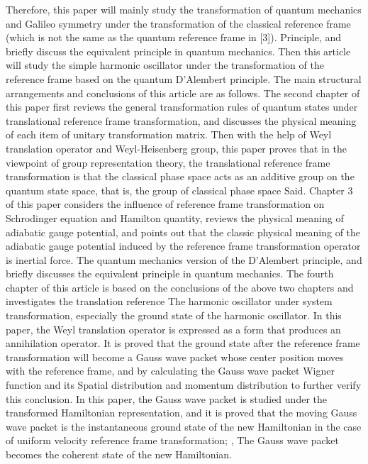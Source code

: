 \documentclass{article}
\begin{document}
        Therefore, this paper will mainly study the transformation of quantum mechanics and Galileo symmetry under the transformation of the classical reference frame (which is not the same as the quantum reference frame in [3]). Principle, and briefly discuss the equivalent principle in quantum mechanics. Then this article will study the simple harmonic oscillator under the transformation of the reference frame based on the quantum D'Alembert principle.
        The main structural arrangements and conclusions of this article are as follows. The second chapter of this paper first reviews the general transformation rules of quantum states under translational reference frame transformation, and discusses the physical meaning of each item of unitary transformation matrix. Then with the help of Weyl translation operator and Weyl-Heisenberg group, this paper proves that in the viewpoint of group representation theory, the translational reference frame transformation is that the classical phase space acts as an additive group on the quantum state space, that is, the group of classical phase space Said. Chapter 3 of this paper considers the influence of reference frame transformation on Schrodinger equation and Hamilton quantity, reviews the physical meaning of adiabatic gauge potential, and points out that the classic physical meaning of the adiabatic gauge potential induced by the reference frame transformation operator is inertial force. The quantum mechanics version of the D'Alembert principle, and briefly discusses the equivalent principle in quantum mechanics. The fourth chapter of this article is based on the conclusions of the above two chapters and investigates the translation reference
        The harmonic oscillator under system transformation, especially the ground state of the harmonic oscillator. In this paper, the Weyl translation operator is expressed as a form that produces an annihilation operator. It is proved that the ground state after the reference frame transformation will become a Gauss wave packet whose center position moves with the reference frame, and by calculating the Gauss wave packet Wigner function and its Spatial distribution and momentum distribution to further verify this conclusion. In this paper, the Gauss wave packet is studied under the transformed Hamiltonian representation, and it is proved that the moving Gauss wave packet is the instantaneous ground state of the new Hamiltonian in the case of uniform velocity reference frame transformation; , The Gauss wave packet becomes the coherent state of the new Hamiltonian.
\end{document}
